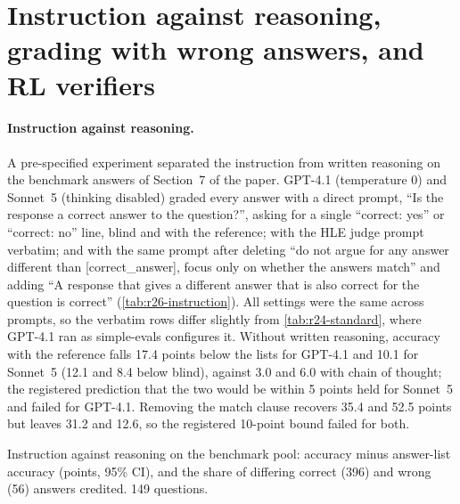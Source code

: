 \FloatBarrier
\section{Instruction against reasoning, grading with wrong answers, and RL verifiers}
\label{app:r26}

\paragraph{Instruction against reasoning.} A pre-specified experiment separated the instruction from written reasoning on the benchmark answers of Section~7 of the paper. GPT-4.1 (temperature 0) and Sonnet~5 (thinking disabled) graded every answer with a direct prompt, ``Is the response a correct answer to the question?'', asking for a single ``correct: yes'' or ``correct: no'' line, blind and with the reference; with the HLE judge prompt verbatim; and with the same prompt after deleting ``do not argue for any answer different than [correct\_answer], focus only on whether the answers match'' and adding ``A response that gives a different answer that is also correct for the question is correct'' (\cref{tab:r26-instruction}). All settings were the same across prompts, so the verbatim rows differ slightly from \cref{tab:r24-standard}, where GPT-4.1 ran as simple-evals configures it. Without written reasoning, accuracy with the reference falls 17.4 points below the lists for GPT-4.1 and 10.1 for Sonnet~5 (12.1 and 8.4 below blind), against 3.0 and 6.0 with chain of thought; the registered prediction that the two would be within 5 points held for Sonnet~5 and failed for GPT-4.1. Removing the match clause recovers 35.4 and 52.5 points but leaves 31.2 and 12.6, so the registered 10-point bound failed for both.

\begin{table}[htbp]
\centering
\caption{Instruction against reasoning on the benchmark pool: accuracy minus answer-list accuracy (points, 95\% CI), and the share of differing correct (396) and wrong (56) answers credited. 149 questions.\pre}
\label{tab:r26-instruction}
\footnotesize
\setlength{\tabcolsep}{3pt}
\begin{adjustbox}{max width=\linewidth}\end{adjustbox}
\end{table}

